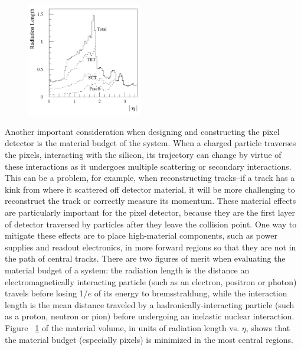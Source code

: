 \begin{figure}
  \begin{center}
	\includegraphics[width=0.45\textwidth]{ATLASDetector/images/id_material_budget.pdf}
	\label{fig:id_material}
	\end{center}
\end{figure}

Another important consideration when designing and constructing the pixel detector is the material budget of the system.  When a 
charged particle traverses the pixels, interacting with the silicon, its trajectory can change by virtue of these interactions 
as it undergoes multiple scattering or secondary interactions.  This can be a problem, for example, when reconstructing 
tracks--if a track has a kink from where it scattered off detector material, it will be more 
challenging to reconstruct the track or correctly measure its momentum.  These material effects are particularly important for the pixel 
detector, because they are the first layer of detector traversed by particles after they leave the collision point.  
One way to mitigate these effects are to place high-material components, such as power supplies and readout 
electronics, in more forward regions so that they are not in the path of central tracks.  There are 
two figures of merit when evaluating the material budget of a system: the radiation length is the distance an 
electromagnetically interacting particle (such as an electron, positron or photon) travels before losing 1/$e$ 
of its energy to bremsstrahlung, while the interaction length is the mean distance traveled by a hadronically-interacting 
particle (such as a proton, neutron or pion) before undergoing an inelastic nuclear interaction.  Figure ~\ref{fig:id_material} 
of the material volume, in units of radiation length vs. $\eta$, shows that the material budget 
(especially pixels) is minimized in the most central regions.



